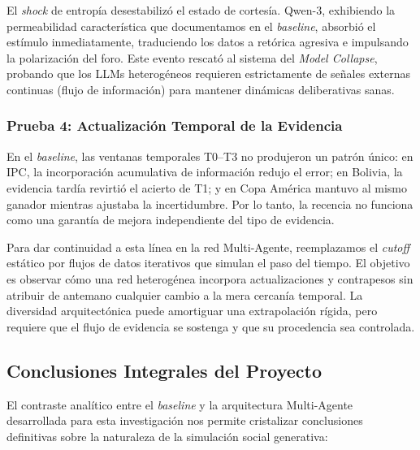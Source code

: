 ﻿\documentclass{article}
\begin{document}
El \textit{shock} de entropía desestabilizó el estado de cortesía. Qwen-3, exhibiendo la permeabilidad característica que documentamos en el \textit{baseline}, absorbió el estímulo inmediatamente, traduciendo los datos a retórica agresiva e impulsando la polarización del foro. Este evento rescató al sistema del \textit{Model Collapse}, probando que los LLMs heterogéneos requieren estrictamente de señales externas continuas (flujo de información) para mantener dinámicas deliberativas sanas.

\subsubsection{Prueba 4: Actualización Temporal de la Evidencia}

En el \textit{baseline}, las ventanas temporales T0--T3 no produjeron un patrón único: en IPC, la incorporación acumulativa de información redujo el error; en Bolivia, la evidencia tardía revirtió el acierto de T1; y en Copa América mantuvo al mismo ganador mientras ajustaba la incertidumbre. Por lo tanto, la recencia no funciona como una garantía de mejora independiente del tipo de evidencia.

Para dar continuidad a esta línea en la red Multi-Agente, reemplazamos el \textit{cutoff} estático por flujos de datos iterativos que simulan el paso del tiempo. El objetivo es observar cómo una red heterogénea incorpora actualizaciones y contrapesos sin atribuir de antemano cualquier cambio a la mera cercanía temporal. La diversidad arquitectónica puede amortiguar una extrapolación rígida, pero requiere que el flujo de evidencia se sostenga y que su procedencia sea controlada.


\subsection{Conclusiones Integrales del Proyecto}

El contraste analítico entre el \textit{baseline} y la arquitectura Multi-Agente desarrollada para esta investigación nos permite cristalizar conclusiones definitivas sobre la naturaleza de la simulación social generativa:
\end{document}
